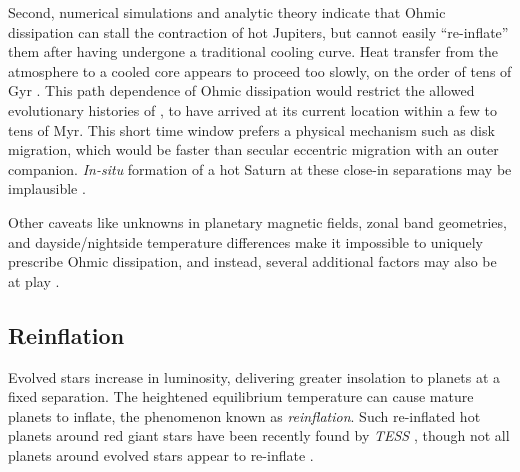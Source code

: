 \documentclass[twocolumn]{aastex631}
\newcommand{\hatpb}{\object{HAT-P-67 b}}
\begin{document}
Second, numerical simulations \citep{2013ApJ...763...13W} and analytic theory \citep{2016ApJ...819..116G} indicate that Ohmic dissipation can stall the contraction of hot Jupiters, but cannot easily ``re-inflate'' them after having undergone a traditional cooling curve.  Heat transfer from the atmosphere to a cooled core appears to proceed too slowly, on the order of tens of Gyr \citep{2016ApJ...819..116G}.  This path dependence of Ohmic dissipation would restrict the allowed evolutionary histories of \hatpb, to have arrived at its current location within a few to tens of Myr.  This short time window prefers a physical mechanism such as disk migration, which would be faster than secular eccentric migration with an outer companion. \emph{In-situ} formation of a hot Saturn at these close-in separations may be implausible \citep{2018ARA&A..56..175D}.  

Other caveats like unknowns in planetary magnetic fields, zonal band geometries, and dayside/nightside temperature differences make it impossible to uniquely prescribe Ohmic dissipation, and instead, several additional factors may also be at play \citep{2021A&A...645A..79S}.


\subsection{Reinflation}
Evolved stars increase in luminosity, delivering greater insolation to planets at a fixed separation.  The heightened equilibrium temperature can cause mature planets to inflate, the phenomenon known as \emph{reinflation}.  Such re-inflated hot planets around red giant stars have been recently found by \emph{TESS} \citep{2022AJ....163..120G,2023arXiv230306728G}, though not all planets around evolved stars appear to re-inflate \citep{2022AJ....163...53S}.
\end{document}
